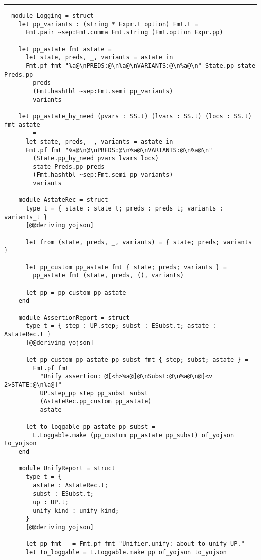 \vspace{2em}
\noindent\rule{\textwidth}{0.5pt}
\vspace{-0.6cm}
\begin{verbatim}
  module Logging = struct
    let pp_variants : (string * Expr.t option) Fmt.t =
      Fmt.pair ~sep:Fmt.comma Fmt.string (Fmt.option Expr.pp)

    let pp_astate fmt astate =
      let state, preds, _, variants = astate in
      Fmt.pf fmt "%a@\nPREDS:@\n%a@\nVARIANTS:@\n%a@\n" State.pp state Preds.pp
        preds
        (Fmt.hashtbl ~sep:Fmt.semi pp_variants)
        variants

    let pp_astate_by_need (pvars : SS.t) (lvars : SS.t) (locs : SS.t) fmt astate
        =
      let state, preds, _, variants = astate in
      Fmt.pf fmt "%a@\n@\nPREDS:@\n%a@\nVARIANTS:@\n%a@\n"
        (State.pp_by_need pvars lvars locs)
        state Preds.pp preds
        (Fmt.hashtbl ~sep:Fmt.semi pp_variants)
        variants

    module AstateRec = struct
      type t = { state : state_t; preds : preds_t; variants : variants_t }
      [@@deriving yojson]

      let from (state, preds, _, variants) = { state; preds; variants }

      let pp_custom pp_astate fmt { state; preds; variants } =
        pp_astate fmt (state, preds, (), variants)

      let pp = pp_custom pp_astate
    end

    module AssertionReport = struct
      type t = { step : UP.step; subst : ESubst.t; astate : AstateRec.t }
      [@@deriving yojson]

      let pp_custom pp_astate pp_subst fmt { step; subst; astate } =
        Fmt.pf fmt
          "Unify assertion: @[<h>%a@]@\nSubst:@\n%a@\n@[<v 2>STATE:@\n%a@]"
          UP.step_pp step pp_subst subst
          (AstateRec.pp_custom pp_astate)
          astate

      let to_loggable pp_astate pp_subst =
        L.Loggable.make (pp_custom pp_astate pp_subst) of_yojson to_yojson
    end

    module UnifyReport = struct
      type t = {
        astate : AstateRec.t;
        subst : ESubst.t;
        up : UP.t;
        unify_kind : unify_kind;
      }
      [@@deriving yojson]

      let pp fmt _ = Fmt.pf fmt "Unifier.unify: about to unify UP."
      let to_loggable = L.Loggable.make pp of_yojson to_yojson


\end{verbatim}
